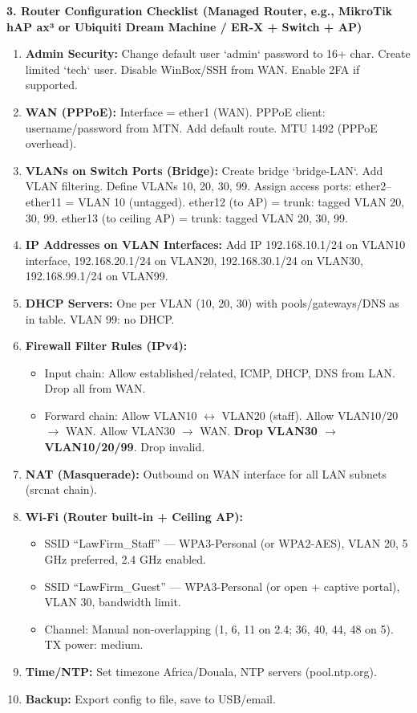 \documentclass[11pt]{article}
\begin{document}
\begin{exoresolu}
\textbf{3. Router Configuration Checklist (Managed Router, e.g., MikroTik hAP ax³ or Ubiquiti Dream Machine / ER-X + Switch + AP)}

\begin{enumerate}
\item \textbf{Admin Security:} Change default user `admin` password to 16+ char. Create limited `tech` user. Disable WinBox/SSH from WAN. Enable 2FA if supported.
\item \textbf{WAN (PPPoE):} Interface = ether1 (WAN). PPPoE client: username/password from MTN. Add default route. MTU 1492 (PPPoE overhead).
\item \textbf{VLANs on Switch Ports (Bridge):} Create bridge `bridge-LAN`. Add VLAN filtering. Define VLANs 10, 20, 30, 99. Assign access ports: ether2–ether11 = VLAN 10 (untagged). ether12 (to AP) = trunk: tagged VLAN 20, 30, 99. ether13 (to ceiling AP) = trunk: tagged VLAN 20, 30, 99.
\item \textbf{IP Addresses on VLAN Interfaces:} Add IP 192.168.10.1/24 on VLAN10 interface, 192.168.20.1/24 on VLAN20, 192.168.30.1/24 on VLAN30, 192.168.99.1/24 on VLAN99.
\item \textbf{DHCP Servers:} One per VLAN (10, 20, 30) with pools/gateways/DNS as in table. VLAN 99: no DHCP.
\item \textbf{Firewall Filter Rules (IPv4):}
      \begin{itemize}
      \item Input chain: Allow established/related, ICMP, DHCP, DNS from LAN. Drop all from WAN.
      \item Forward chain: Allow VLAN10 $\leftrightarrow$ VLAN20 (staff). Allow VLAN10/20 $\rightarrow$ WAN. Allow VLAN30 $\rightarrow$ WAN. \textbf{Drop VLAN30 $\rightarrow$ VLAN10/20/99}. Drop invalid.
      \end{itemize}
\item \textbf{NAT (Masquerade):} Outbound on WAN interface for all LAN subnets (srcnat chain).
\item \textbf{Wi-Fi (Router built-in + Ceiling AP):}
      \begin{itemize}
      \item SSID ``LawFirm\_Staff'' — WPA3-Personal (or WPA2-AES), VLAN 20, 5 GHz preferred, 2.4 GHz enabled.
      \item SSID ``LawFirm\_Guest'' — WPA3-Personal (or open + captive portal), VLAN 30, bandwidth limit.
      \item Channel: Manual non-overlapping (1, 6, 11 on 2.4; 36, 40, 44, 48 on 5). TX power: medium.
      \end{itemize}
\item \textbf{Time/NTP:} Set timezone Africa/Douala, NTP servers (pool.ntp.org).
\item \textbf{Backup:} Export config to file, save to USB/email.
\end{enumerate}


\end{exoresolu}
\end{document}
